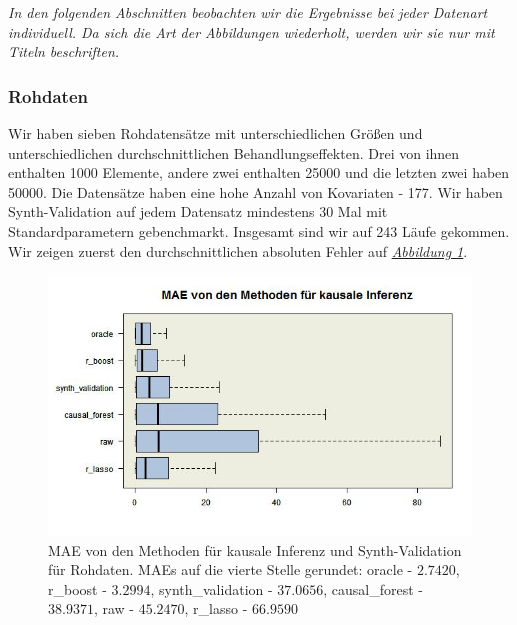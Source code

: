 \documentclass[12pt,a4paper,twoside]{scrartcl}
\numberwithin{equation}{section}
\newcommand{\reffig}[1]{\emph{\hyperref[#1]{Abbildung \ref*{#1}}}}
\begin{document}
\noindent
\emph{In den folgenden Abschnitten beobachten wir die Ergebnisse bei jeder Datenart individuell. Da sich die Art der Abbildungen wiederholt, werden wir sie nur mit Titeln beschriften.}\par

\subsubsection{Rohdaten}\label{subsubsec:ergebnisseRohdaten}

Wir haben sieben Rohdatensätze mit unterschiedlichen Größen und unterschiedlichen durchschnittlichen Behandlungseffekten. Drei von ihnen enthalten 1000 Elemente, andere zwei enthalten 25000 und die letzten zwei haben 50000. Die Datensätze haben eine hohe Anzahl von Kovariaten - 177. Wir haben Synth-Validation auf jedem Datensatz mindestens 30 Mal mit Standardparametern gebenchmarkt. Insgesamt sind wir auf 243 Läufe gekommen. Wir zeigen zuerst den durchschnittlichen absoluten Fehler auf \reffig{fig:rawDataBoxplot}.\par 

\begin{center}
\begin{figure}[h]
    \centering
    \includegraphics[height=0.5\textwidth, width=1\textwidth]{figures/plots/rawDataBoxplot.jpeg}
    \caption[MAE von den Methoden für kausale Inferenz und Synth-Validation für Rohdaten]{MAE von den Methoden für kausale Inferenz und Synth-Validation für Rohdaten. MAEs auf die vierte Stelle gerundet: oracle - $2.7420$, r\_boost - $3.2994$, synth\_validation - $37.0656$, causal\_forest - $38.9371$, raw - $45.2470$, r\_lasso - $66.9590$}\label{fig:rawDataBoxplot}
  \end{figure}
\end{center}
   
\end{document}
